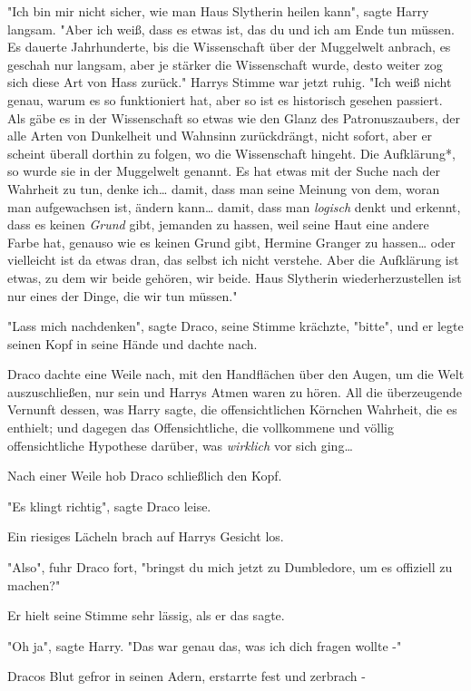 {"Ich bin mir nicht sicher, wie man Haus Slytherin heilen kann", sagte Harry langsam. "Aber ich weiß, dass es etwas ist, das du und ich am Ende tun müssen. Es dauerte Jahrhunderte, bis die Wissenschaft über der Muggelwelt anbrach, es geschah nur langsam, aber je stärker die Wissenschaft wurde, desto weiter zog sich diese Art von Hass zurück." Harrys Stimme war jetzt ruhig. "Ich weiß nicht genau, warum es so funktioniert hat, aber so ist es historisch gesehen passiert. Als gäbe es in der Wissenschaft so etwas wie den Glanz des Patronuszaubers, der alle Arten von Dunkelheit und Wahnsinn zurückdrängt, nicht sofort, aber er scheint überall dorthin zu folgen, wo die Wissenschaft hingeht. Die Aufklärung*, so wurde sie in der Muggelwelt genannt. Es hat etwas mit der Suche nach der Wahrheit zu tun, denke ich… damit, dass man seine Meinung von dem, woran man aufgewachsen ist, ändern kann… damit, dass man \emph{logisch} denkt und erkennt, dass es keinen \emph{Grund} gibt, jemanden zu hassen, weil seine Haut eine andere Farbe hat, genauso wie es keinen Grund gibt, Hermine Granger zu hassen… oder vielleicht ist da etwas dran, das selbst ich nicht verstehe. Aber die Aufklärung ist etwas, zu dem wir beide gehören, wir beide. Haus Slytherin wiederherzustellen ist nur eines der Dinge, die wir tun müssen."

"Lass mich nachdenken", sagte Draco, seine Stimme krächzte, "bitte", und er legte seinen Kopf in seine Hände und dachte nach.

Draco dachte eine Weile nach, mit den Handflächen über den Augen, um die Welt auszuschließen, nur sein und Harrys Atmen waren zu hören. All die überzeugende Vernunft dessen, was Harry sagte, die offensichtlichen Körnchen Wahrheit, die es enthielt; und dagegen das Offensichtliche, die vollkommene und völlig offensichtliche Hypothese darüber, was \emph{wirklich} vor sich ging…

Nach einer Weile hob Draco schließlich den Kopf.

"Es klingt richtig", sagte Draco leise.

Ein riesiges Lächeln brach auf Harrys Gesicht los.

"Also", fuhr Draco fort, "bringst du mich jetzt zu Dumbledore, um es offiziell zu machen?"

Er hielt seine Stimme sehr lässig, als er das sagte.

"Oh ja", sagte Harry. "Das war genau das, was ich dich fragen wollte -"

Dracos Blut gefror in seinen Adern, erstarrte fest und zerbrach -

}
